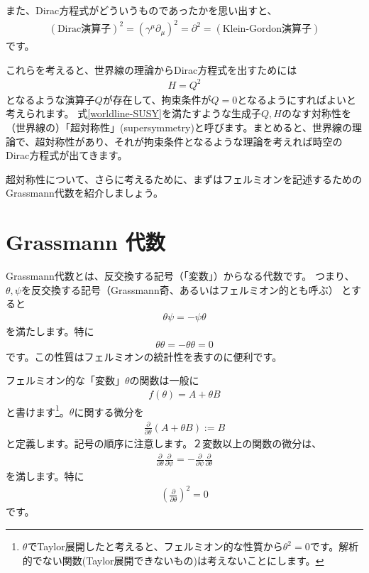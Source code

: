 \documentclass[report,paper=a4, fontsize=12pt, line_length=16cm, number_of_lines=33,dvipdfmx]{jlreq}
\numberwithin{equation}{chapter}
\numberwithin{equation}{section}
\newcommand{\del}{\partial}
\newcommand{\deldel}[2]{\frac{\del {#1}}{\del {#2}}}
\begin{document}
また、Dirac方程式がどういうものであったかを思い出すと、
\begin{align}
(\text{Dirac演算子})^2 =(\gamma^{\mu}\del_{\mu})^2
=\del^2 = (\text{Klein-Gordon演算子})
\end{align}
です。

これらを考えると、世界線の理論からDirac方程式を出すためには
\begin{align}
H=Q^2\label{worldline-SUSY}
\end{align}
となるような演算子$Q$が存在して、拘束条件が$Q=0$となるようにすればよいと考えられます。
式\eqref{worldline-SUSY}を満たすような生成子$Q,H$のなす対称性を（世界線の）「超対称性」(supersymmetry)と呼びます。まとめると、世界線の理論で、超対称性があり、それが拘束条件となるような理論を考えれば時空のDirac方程式が出てきます。

超対称性について、さらに考えるために、まずはフェルミオンを記述するためのGrassmann代数を紹介しましょう。
\section{Grassmann 代数}
Grassmann代数とは、反交換する記号（「変数」）からなる代数です。
つまり、$\theta,\psi$を反交換する記号（Grassmann奇、あるいはフェルミオン的とも呼ぶ）
とすると
\begin{align}
\theta\psi=-\psi\theta
\end{align}
を満たします。特に
\begin{align}
\theta\theta = -\theta\theta =0
\end{align}
です。この性質はフェルミオンの統計性を表すのに便利です。

フェルミオン的な「変数」$\theta$の関数は一般に
\begin{align}
f(\theta)=A+\theta B
\end{align}
と書けます\footnote{$\theta$でTaylor展開したと考えると、フェルミオン的な性質から$\theta^2=0$です。解析的でない関数(Taylor展開できないもの)は考えないことにします。}。$\theta$に関する微分を
\begin{align}
\deldel{}{\theta} (A+\theta B):=B
\end{align}
と定義します。記号の順序に注意します。２変数以上の関数の微分は、
\begin{align}
\deldel{}{\theta}\deldel{}{\psi}
=
-\deldel{}{\psi}\deldel{}{\theta}
\end{align}
を満します。特に
\begin{align}
\left(\deldel{}{\theta}\right)^2=0
\end{align}
です。
\end{document}
